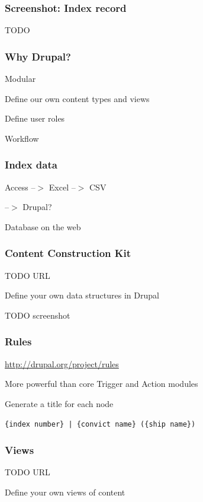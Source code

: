 \documentclass[ignorenonframetext,11pt]{beamer}
\begin{document}
\begin{frame}
\frametitle{Screenshot: Index record}
\label{screenshot:indexrecord}

TODO



\end{frame}
		

\begin{frame}
\frametitle{Why Drupal?}
\label{whydrupal}

Modular


Define our own content types and views


Define user roles


Workflow



\end{frame}
		

\begin{frame}
\frametitle{Index data}
\label{indexdata}

Access --$>$ Excel --$>$ CSV


--$>$ Drupal?


Database on the web



\end{frame}
		

\begin{frame}
\frametitle{Content Construction Kit}
\label{contentconstructionkit}

TODO URL


Define your own data structures in Drupal


TODO screenshot



\end{frame}
		

\begin{frame}
\frametitle{Rules}
\label{rules}

\url{http://drupal.org/project/rules}


More powerful than core Trigger and Action modules


Generate a title for each node


\texttt{\{index number\} | \{convict name\} (\{ship name\})}



\end{frame}
		

\begin{frame}
\frametitle{Views}
\label{views}

TODO URL


Define your own views of content



\end{frame}
		
\end{document}
